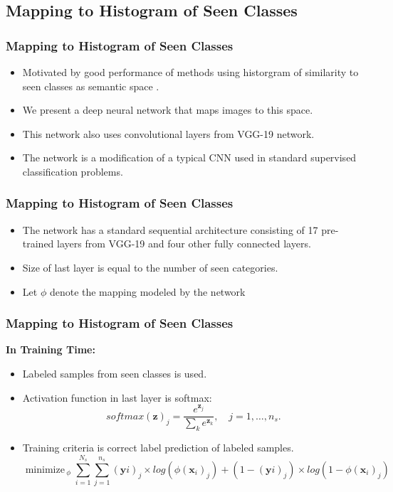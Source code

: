 \documentclass{beamer}
\DeclareMathOperator*{\minimize}{minimize\,}
\begin{document}
\subsection{Mapping to Histogram of Seen Classes}
\label{sec:Mapping to Histogram of Seen Classes}
\begin{frame} \frametitle{Mapping to Histogram of Seen Classes}
  \begin{itemize}
    \item
  Motivated by good performance of methods using historgram of similarity to seen
  classes as semantic space \cite{sse}.
\item
  We present a deep neural network that maps images to this space.
  \item
  This network also uses convolutional layers from VGG-19 network.
  \item
  The network is a modification of a typical CNN used in standard supervised classification problems.
\end{itemize}
\end{frame}

\begin{frame} \frametitle{Mapping to Histogram of Seen Classes}
  \begin{itemize}
    \item
  The network  has a standard sequential architecture consisting of 17 pre-trained layers from VGG-19 and four other fully connected layers. \\
  \item
  Size of last layer is equal to the number of seen categories.
  \item
  Let $\phi$ denote the mapping modeled by the network
\end{itemize}
\end{frame}


\begin{frame}\frametitle{Mapping to Histogram of Seen Classes}
  \textbf{In Training Time:}
  \begin{itemize}
  \item Labeled samples from seen classes is used.
  \item Activation function in last layer is softmax:
    \begin{equation}
\label{softmax}
softmax(\mathbf{z})_j = \frac{e^{\mathbf{z}_j}}{\sum_k e^{\mathbf{z}_k}}, \quad j = 1, \ldots, n_s.
\end{equation}
  \item Training criteria is correct label prediction of labeled samples.
  \begin{equation}
  \minimize_{\phi} \sum_{i=1}^{N_s} \sum_{j=1}^{n_s} (\mathbf{y}i)_j \times log(\phi(\mathbf{x}_i)_j) + (1- (\mathbf{y}i)_j) \times log(1 - \phi(\mathbf{x}_i)_j)
\end{equation}
\end{itemize}
\end{frame}
\end{document}
